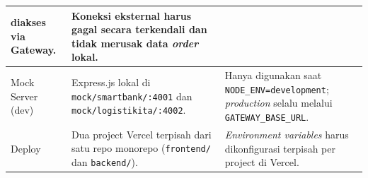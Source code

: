 \begin{longtable}{|L{2.8cm}|L{5.5cm}|L{6.2cm}|}
          diakses via Gateway.
        & Koneksi eksternal harus gagal secara terkendali dan tidak merusak data
          \textit{order} lokal. \\
    \hline
    Mock Server (dev)
        & Express.js lokal di \texttt{mock/smartbank/:4001} dan
          \texttt{mock/logistikita/:4002}.
        & Hanya digunakan saat \texttt{NODE\_ENV=development}; \textit{production}
          selalu melalui \texttt{GATEWAY\_BASE\_URL}. \\
    \hline
    Deploy
        & Dua project Vercel terpisah dari satu repo monorepo (\texttt{frontend/}
          dan \texttt{backend/}).
        & \textit{Environment variables} harus dikonfigurasi terpisah per project
          di Vercel. \\
    \hline
\end{longtable}

